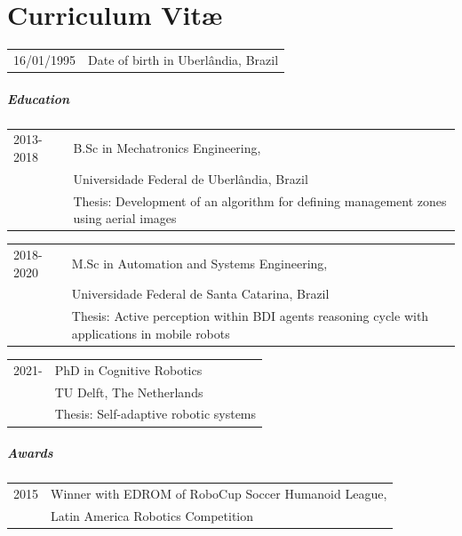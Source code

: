 \chapter*{Curriculum Vit\ae}

\makeatletter
\authors{\@firstname\ {\titleshape\@lastname}}
\makeatother

\noindent
\begin{longtable}{p{} p{}}
    16/01/1995 & Date of birth in Uberlândia, Brazil
\end{longtable}

\paragraph{Education}

\begin{longtable}{p{} p{}}
    2013-2018 & B.Sc in Mechatronics Engineering, \\
              & Universidade Federal de Uberlândia, Brazil\\
              & Thesis: Development of an algorithm for defining management zones using aerial images
\end{longtable}
\begin{longtable}{p{} p{}}
    2018-2020 & M.Sc in Automation and Systems Engineering, \\
              & Universidade Federal de Santa Catarina, Brazil \\
              & Thesis: Active perception within BDI agents reasoning cycle with applications in mobile robots
\end{longtable}
\begin{longtable}{p{} p{}}
    2021-     & PhD in Cognitive Robotics \\
              & TU Delft, The Netherlands \\
              & Thesis: Self-adaptive robotic systems
\end{longtable}

\paragraph{Awards}

\begin{longtable}{p{} p{}}
    2015 & Winner with EDROM of RoboCup Soccer Humanoid League, \\
         & Latin America Robotics Competition
\end{longtable}

